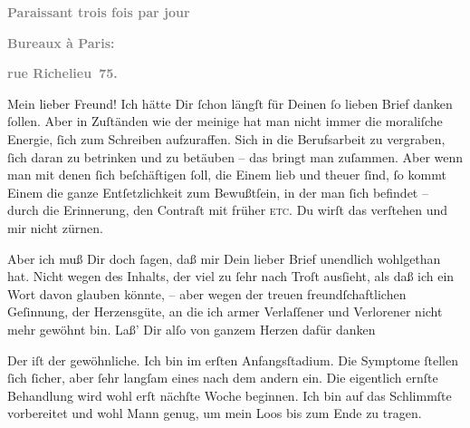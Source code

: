 \pstart
           \begin{otherlanguage}{french}\textcolor{gray}{\textbf{\textbf{Paraissant trois fois par jour}}}\end{otherlanguage}\pend
           
\pstart
           \begin{otherlanguage}{french}\textcolor{gray}{\textbf{\textbf{Bureaux à Paris:}}}\end{otherlanguage}\pend
           
\pstart
           \begin{otherlanguage}{french}\textcolor{gray}{\textbf{\textbf{rue Richelieu 75.}}}\end{otherlanguage}\pend
           
\pstart\center{}Mein lieber Freund!\pend\vspace{0.5em}
\pstart
           Ich hätte Dir{ }ſchon längſt für Deinen{ }ſo lieben Brief danken{ }ſollen. Aber in
               Zuſtänden wie der meinige hat man nicht immer die moraliſche Energie,{ }ſich zum
               Schreiben aufzuraffen. Sich in die Berufsarbeit zu vergraben,{ }ſich daran zu betrinken
               und zu betäuben – das bringt man zuſammen. Aber wenn man mit denen{ }ſich beſchäftigen{ }ſoll, die Einem lieb und theuer{ }ſind,{ }ſo kommt Einem die ganze Entſetzlichkeit zum
               Bewußtſein, in der man{ }ſich befindet – durch die Erin{\pb}nerung, den Contraſt mit früher \textsc{etc}. Du wirſt das
               verſtehen und mir nicht zürnen.\pend
           
\pstart
           Aber ich muß Dir doch{ }ſagen, daß mir Dein lieber Brief unendlich wohlgethan hat.
               Nicht wegen des Inhalts, der viel zu{ }ſehr nach Troſt ausſieht, als daß ich ein Wort
               davon glauben könnte, – aber wegen der treuen freundſchaftlichen Geſinnung, der
               Herzensgüte, an die ich armer Verlaſſener und Verlorener nicht mehr gewöhnt bin. Laß’
               Dir alſo von ganzem Herzen dafür danken{\dotsfour}\pend
           
\pstart
           Der \label{K_L02705-1v}\label{K_L02705-1} iſt der gewöhnliche. Ich bin im erſten Anfangsſtadium. Die Symptome{ }ſtellen{ }ſich{ }ſicher, aber{ }ſehr langſam eines nach dem {\pb}andern ein. Die eigentlich ernſte Behandlung wird wohl erſt nächſte Woche beginnen.
               Ich bin auf das Schlimmſte vorbereitet und wohl Mann genug, um mein Loos bis zum Ende
               zu tragen.\pend
           
